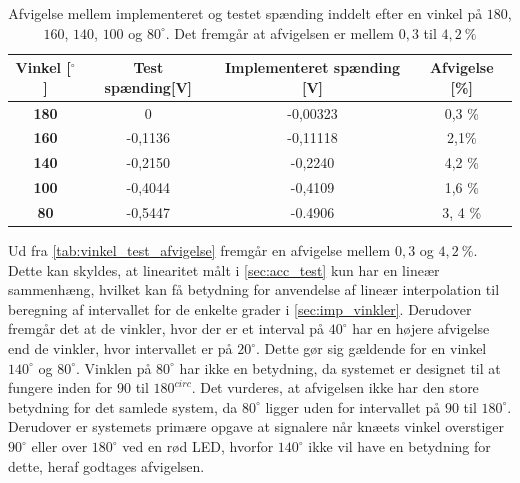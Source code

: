 \begin{table}[H]
\centering
\begin{tabular}{|c|c|c|c|}
\hline
\textbf{Vinkel {[}{$^{\circ}$}{]}} & \textbf{Test spænding{[}V{]}} & \textbf{Implementeret spænding {[}V{]}} & \textbf{Afvigelse {[}\%{]}} \\ \hline
\textbf{180}                    & 0                         & -0,00323                       & 0,3 \%                      \\ \hline
\textbf{160}                    & -0,1136                   & -0,11118                       & 2,1\%                       \\ \hline
\textbf{140}                    & -0,2150                   & -0,2240                        & 4,2 \%                      \\ \hline
\textbf{100}                    & -0,4044                   & -0,4109                        & 1,6 \%                      \\ \hline
\textbf{80}                     & -0,5447                   & -0.4906                        & 3, 4 \%                    \\ \hline
\end{tabular}
\caption{Afvigelse mellem implementeret og testet spænding inddelt efter en vinkel på $180$, $160$, $140$, $100$ og $80^{\circ}$. Det fremgår at afvigelsen er mellem $0,3$ til $4,2~\%$}
\label{tab:vinkel_test_afvigelse}
\end{table}

Ud fra \autoref{tab:vinkel_test_afvigelse} fremgår en afvigelse mellem $0,3$ og $4,2~\%$. Dette kan skyldes, at linearitet målt i \autoref{sec:acc_test} kun har en lineær sammenhæng, hvilket kan få betydning for anvendelse af lineær interpolation til beregning af intervallet for de enkelte grader i \autoref{sec:imp_vinkler}. Derudover fremgår det at de vinkler, hvor der er et interval på $40^{\circ}$ har en højere afvigelse end de vinkler, hvor intervallet er på $20^{\circ}$. Dette gør sig gældende for en vinkel $140^{\circ}$ og $80^{\circ}$. Vinklen på $80^{\circ}$ har ikke en betydning, da systemet er designet til at fungere inden for $90$ til $180^{circ}$.
Det vurderes, at afvigelsen ikke har den store betydning for det samlede system, da $80^{\circ}$ ligger uden for intervallet på $90$ til $180^{\circ}$. Derudover er systemets primære opgave at signalere når knæets vinkel overstiger $90^{\circ}$ eller over $180^{\circ}$ ved en rød LED, hvorfor $140^{\circ}$ ikke vil have en betydning for dette, heraf godtages afvigelsen. 

